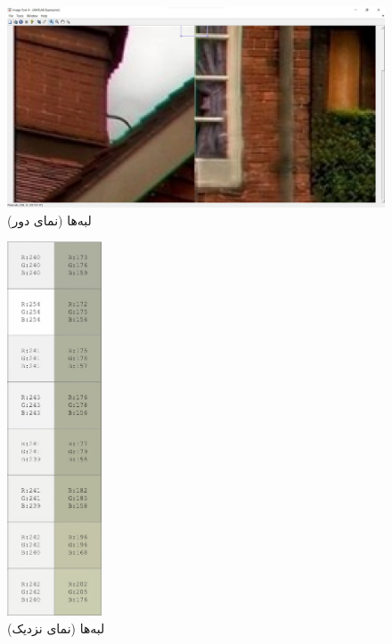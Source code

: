 \documentclass{article}
\begin{document}
\begin{figure}[H]
    \centering
    \includegraphics[width=1.0\textwidth]{figures/2p3p.jpg}
    \caption
	{
لبه‌ها (نمای دور)
	}
    \label{fig:fig1}
\end{figure}
\begin{figure}[H]
    \centering
    \includegraphics[width=0.25\textwidth]{figures/2p3.jpg}
    \caption
	{
لبه‌ها (نمای نزدیک)
	}
    \label{fig:fig1}
\end{figure}
\end{document}
